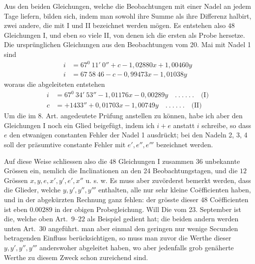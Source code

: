 Aus den beiden Gleichungen, welche die Beobachtungen mit einer Nadel an jedem Tage liefern, bilden sich, indem man sowohl ihre Summe als ihre Differenz halbirt, zwei andere, die mit I und II bezeichnet werden mögen. Es entstehen also $48$ Gleichungen I, und eben so viele II, von denen ich die ersten als Probe hersetze. Die ursprünglichen Gleichungen aus den Beobachtungen vom 20. Mai mit Nadel 1 sind
\[
\begin{aligned}
i&=67^0\ 11'\ 0''+c-1{,}02880x+1{,}00460y\\
i&=67\ 58\ 46-c-0{,}99473x-1{,}01038y
\end{aligned}
\]
woraus die abgeleiteten entstehen
\[
\begin{aligned}
i&=67^0\ 34'\ 53''-1{,}01176x-0{,}00289y\quad.\ .\ .\ .\ .\ .\quad\text{(I)}\\
c&=+1433''+0{,}01703x-1{,}00749y\quad.\ .\ .\ .\ .\ .\quad\text{(II)}
\end{aligned}
\]
Um die im 8. Art. angedeutete Prüfung anstellen zu können, habe ich aber den Gleichungen I noch ein Glied beigefügt, indem ich $i+e$ anstatt $i$ schreibe, so dass $e$ den etwanigen constanten Fehler der Nadel 1 ausdrückt; bei den Nadeln 2, 3, 4 soll der präsumtive constante Fehler mit $e',e'',e'''$ bezeichnet werden.

Auf diese Weise schliessen also die $48$ Gleichungen I zusammen $36$ unbekannte Grössen ein, nemlich die Inclinationen an den 24 Beobachtungstagen, und die $12$ Grössen $x,y,e,x',y',e',x''$ u. s. w. Es muss aber zuvörderst bemerkt werden, dass die Glieder, welche $y,y',y'',y'''$ enthalten, alle nur sehr kleine Coëfficienten haben, und in der abgekürzten Rechnung ganz fehlen: der grösste dieser $48$ Coëfficienten ist eben $0.00289$ in der obigen Probegleichung. Will
\expandafter\def\csname HistoricalNoteText486\endcsname{Die vom 23. September ist die, welche oben Art.\ $9$–$22$ als Beispiel gedient hat; die beiden andern werden unten Art.\ $30$ angeführt.}
man aber einmal den geringen nur wenige Secunden betragenden Einfluss berücksichtigen, so muss man zuvor die Werthe dieser $y,y',y'',y'''$ anderswoher abgeleitet haben, wo aber jedenfalls grob genäherte Werthe zu diesem Zweck schon zureichend sind.

